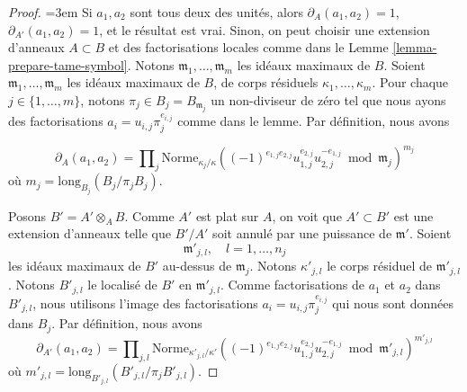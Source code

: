 \begin{proof}
{\emergencystretch=3em Si $a_1, a_2$ sont tous deux des unités, alors $\partial_A(a_1, a_2) = 1$,
$\partial_{A'}(a_1, a_2) = 1$, et le résultat est vrai.
Sinon, on peut choisir une extension d'anneaux $A \subset B$ et
des factorisations locales comme dans le Lemme \ref{lemma-prepare-tame-symbol}.
Notons $\mathfrak m_1, \ldots, \mathfrak m_m$
les idéaux maximaux de $B$. Soient $\mathfrak m_1, \ldots, \mathfrak m_m$
les idéaux maximaux de $B$, de corps résiduels $\kappa_1, \ldots, \kappa_m$.
Pour chaque $j \in \{1, \ldots, m\}$, notons $\pi_j \in B_j = B_{\mathfrak m_j}$
un non-diviseur de zéro tel que nous ayons des factorisations
$a_i = u_{i, j}\pi_j^{e_{i, j}}$ comme dans le lemme.
Par définition, nous avons\par}
$$
\partial_A(a_1, a_2) = \prod\nolimits_j
\text{Norme}_{\kappa_j/\kappa}
((-1)^{e_{1, j}e_{2, j}}u_{1, j}^{e_{2, j}}u_{2, j}^{-e_{1, j}}
\bmod \mathfrak m_j)^{m_j}
$$
où $m_j = \text{long}_{B_j}(B_j/\pi_j B_j)$.

\medskip\noindent
Posons $B' = A' \otimes_A B$. Comme $A'$ est plat sur $A$, on voit
que $A' \subset B'$ est une extension d'anneaux telle que $B'/A'$ soit annulé
par une puissance de $\mathfrak m'$. Soient
$$
\mathfrak m'_{j, l},\quad l = 1, \ldots, n_j
$$
les idéaux maximaux de $B'$ au-dessus de $\mathfrak m_j$. Notons
$\kappa'_{j, l}$ le corps résiduel de $\mathfrak m'_{j, l}$. Notons
$B'_{j, l}$ le localisé de $B'$ en $\mathfrak m'_{j, l}$.
Comme factorisations de $a_1$ et $a_2$ dans $B'_{j, l}$,
nous utilisons l'image des factorisations
$a_i = u_{i, j} \pi_j^{e_{i, j}}$ qui nous sont données dans $B_j$.
Par définition, nous avons
$$
\partial_{A'}(a_1, a_2) = \prod\nolimits_{j, l}
\text{Norme}_{\kappa'_{j, l}/\kappa'}
((-1)^{e_{1, j}e_{2, j}}u_{1, j}^{e_{2, j}}u_{2, j}^{-e_{1, j}}
\bmod \mathfrak m'_{j, l})^{m'_{j, l}}
$$
où $m'_{j, l} = \text{long}_{B'_{j, l}}(B'_{j, l}/\pi_j B'_{j, l})$.


\end{proof}

